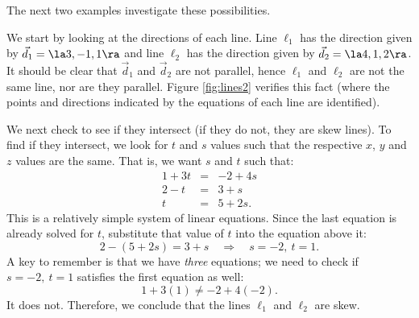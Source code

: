 The next two examples investigate these possibilities.\\

{We start by looking at the directions of each line. Line $\ell_1$ has the direction given by $\vec d_1=\la 3,-1,1\ra$ and line $\ell_2$ has the direction given by $\vec d_2 = \la 4,1,2\ra$. It should be clear that $\vec d_1$ and $\vec d_2$ are not parallel, hence $\ell_1$ and $\ell_2$ are not the same line, nor are they parallel. Figure \ref{fig:lines2} verifies this fact (where the points and directions indicated by the equations of each line are identified).

We next check to see if they intersect (if they do not, they are skew lines). To find if they intersect, we look for $t$ and $s$ values such that the respective $x$, $y$ and $z$ values are the same. That is, we want $s$ and $t$ such that:
$$\begin{array}{ccc}
1+3t &=&-2+4s\\
2-t&=&3+s\\
t&=&5+2s.\end{array}$$
This is a relatively simple system of linear equations. Since the last equation is already solved for $t$, substitute that value of $t$ into the equation above it:
$$2-(5+2s) = 3+s \quad \Rightarrow \quad s=-2,\ t=1.$$
A key to remember is that we have \emph{three} equations; we need to check if $s=-2,\ t=1$ satisfies the first equation as well:
$$1+3(1) \neq -2+4(-2).$$
It does not. Therefore, we conclude that the lines $\ell_1$ and $\ell_2$ are skew.
}\\

